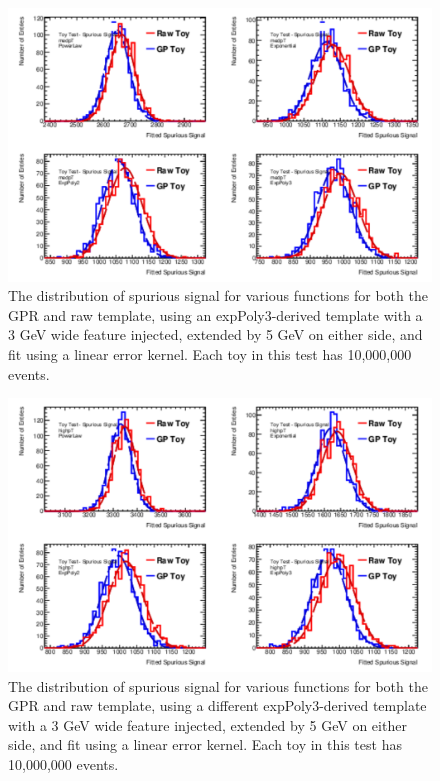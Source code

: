 \begin{figure} 
\begin{center}
  \includegraphics[width=\textwidth]{figures/background/gpr/validation/linear/ToyTest_FitSigVals_medpT_10M_Sig}   
\caption{The distribution of spurious signal for various functions for both the GPR and raw template, using an expPoly3-derived template with a 3 GeV wide feature injected, extended by 5 GeV on either side, and fit using a linear error kernel. Each toy in this test has 10,000,000 events.}
\label{fig:linearkernel_medpt_10M_Sig}
\end{center}
\end{figure}

\begin{figure} 
\begin{center}
  \includegraphics[width=\textwidth]{figures/background/gpr/validation/linear/ToyTest_FitSigVals_highpT_10M_Sig}   
\caption{The distribution of spurious signal for various functions for both the GPR and raw template, using a different expPoly3-derived template with a 3 GeV wide feature injected, extended by 5 GeV on either side, and fit using a linear error kernel. Each toy in this test has 10,000,000 events.}
\label{fig:linearkernel_highpt_10M_Sig}
\end{center}
\end{figure}


